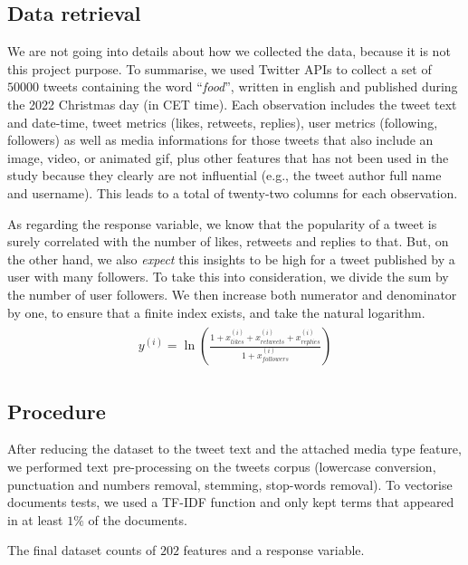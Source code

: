 \documentclass[letterpaper,11pt,english,twocolumn]{article}
\begin{document}
\subsection{Data retrieval}
\label{ssec:dataretrieval}
We are not going into details about how we collected the data, because it is not this project purpose.
To summarise, we used Twitter APIs \cite{DBLP:journals/corr/abs-2105-10724} to collect a set of $50000$ tweets containing the word ``\textit{food}'', written in english and published during the 2022 Christmas day (in CET time). Each observation includes the tweet text and date-time, tweet metrics (likes, retweets, replies), user metrics (following, followers) as well as media informations for those tweets that also include an image, video, or animated gif, plus other features that has not been used in the study because they clearly are not influential (e.g., the tweet author full name and username). This leads to a total of twenty-two columns for each observation.

As regarding the response variable, we know that the popularity of a tweet is surely correlated with the number of likes, retweets and replies to that. But, on the other hand, we also \textit{expect} this insights to be high for a tweet published by a user with many followers. To take this into consideration, we divide the sum by the number of user followers. We then increase both numerator and denominator by one, to ensure that a finite index exists, and take the natural logarithm.
\begin{align*}
\begin{gathered}
	y^{(i)} = \ln \left( \frac{1+x^{(i)}_{likes}+x^{(i)}_{retweets}+x^{(i)}_{replies}}{1+x^{(i)}_{followers}} \right)
\end{gathered}
\end{align*}

\subsection{Procedure}
\label{ssec:procedure}
After reducing the dataset to the tweet text and the attached media type feature, we performed text pre-processing on the tweets corpus (lowercase conversion, punctuation and numbers removal, stemming, stop-words removal). To vectorise documents tests, we used a TF-IDF function \cite{DBLP:journals/corr/abs-1901-09069} and only kept terms that appeared in at least $1\%$ of the documents.

The final dataset counts of $202$ features and a response variable.
\end{document}
